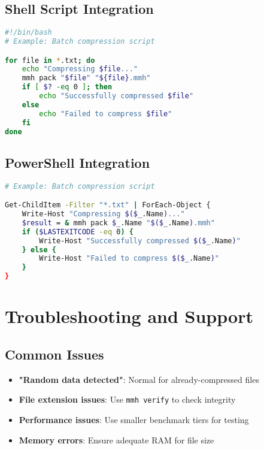 \documentclass[12pt,a4paper]{article}
\begin{document}
\subsection{Shell Script Integration}
\begin{lstlisting}[language=bash, caption=Batch Compression Script]
#!/bin/bash
# Example: Batch compression script

for file in *.txt; do
    echo "Compressing $file..."
    mmh pack "$file" "${file}.mmh"
    if [ $? -eq 0 ]; then
        echo "Successfully compressed $file"
    else
        echo "Failed to compress $file"
    fi
done
\end{lstlisting}

\subsection{PowerShell Integration}
\begin{lstlisting}[language=bash, caption=PowerShell Batch Script]
# Example: Batch compression script

Get-ChildItem -Filter "*.txt" | ForEach-Object {
    Write-Host "Compressing $($_.Name)..."
    $result = & mmh pack $_.Name "$($_.Name).mmh"
    if ($LASTEXITCODE -eq 0) {
        Write-Host "Successfully compressed $($_.Name)"
    } else {
        Write-Host "Failed to compress $($_.Name)"
    }
}
\end{lstlisting}

\newpage

\section{Troubleshooting and Support}

\subsection{Common Issues}
\begin{itemize}
    \item \textbf{"Random data detected"}: Normal for already-compressed files
    \item \textbf{File extension issues}: Use \texttt{mmh verify} to check integrity
    \item \textbf{Performance issues}: Use smaller benchmark tiers for testing
    \item \textbf{Memory errors}: Ensure adequate RAM for file size
\end{itemize}
\end{document}
